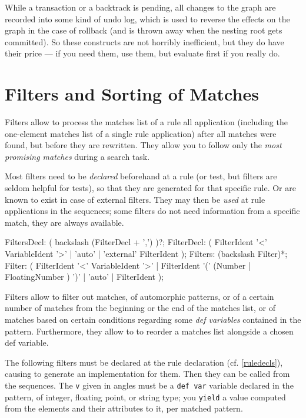 \begin{note}
While a transaction or a backtrack is pending, all changes to the graph are recorded into some kind of undo log, which is used to reverse the effects on the graph in the case of rollback (and is thrown away when the nesting root gets committed).
So these constructs are not horribly inefficient, but they do have their price --- if you need them, use them, but evaluate first if you really do.
\end{note}


\section{Filters and Sorting of Matches}\label{sub:filters}

Filters allow to process the matches list of a rule all application (including the one-element matches list of a single rule application) after all matches were found, but before they are rewritten.
They allow you to follow only the \emph{most promising matches} during a search task.

Most filters need to be \emph{declared} beforehand at a rule (or test, but filters are seldom helpful for tests), so that they are generated for that specific rule. Or are known to exist in case of external filters.
They may then be \emph{used} at rule applications in the sequences; some filters do not need information from a specific match, they are always available.

\begin{rail}
  FiltersDecl: ( backslash (FilterDecl + ',') )?;
  FilterDecl: ( FilterIdent '<' VariableIdent '>' | 'auto' | 'external' FilterIdent );
	Filters: (backslash Filter)*;
  Filter: ( FilterIdent '<' VariableIdent '>' | FilterIdent '(' (Number | FloatingNumber ) ')' | 'auto' | FilterIdent );
\end{rail}

Filters allow to filter out matches, of automorphic patterns, or of a certain number of matches from the beginning or the end of the matches list, or of matches based on certain conditions regarding some \emph{def variables} contained in the pattern.
Furthermore, they allow to to reorder a matches list alongside a chosen def variable.

The following filters must be declared at the rule declaration (cf. \ref{ruledecls}), causing \GrG{ }to generate an implementation for them. 
Then they can be called from the sequences.
The \texttt{v} given in angles must be a \texttt{def var} variable declared in the pattern, of integer, floating point, or string type; you \texttt{yield} a value computed from the elements and their attributes to it, per matched pattern.

